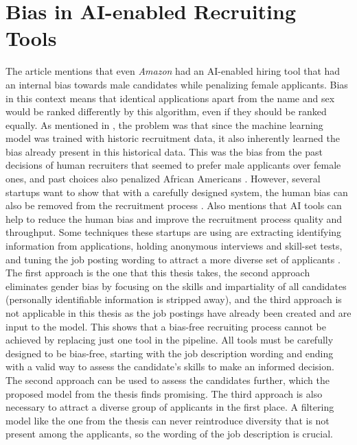 \documentclass[draft,final]{thesisclass} %
\begin{document}
\section{Bias in \acs{AI}-enabled Recruiting Tools}
The article \textcite[9]{bias_ai_hiring} mentions that even \textit{Amazon} had an \acs{AI}-enabled hiring tool that had an internal bias towards male candidates while penalizing female applicants.
Bias in this context means that identical applications apart from the name and sex would be ranked differently by this algorithm, even if they should be ranked equally.
As mentioned in \textcite[9]{bias_ai_hiring}, the problem was that since the machine learning model was trained with historic recruitment data, it also inherently learned the bias already present in this historical data.
This was the bias from the past decisions of human recruiters that seemed to prefer male applicants over female ones, and past choices also penalized African Americans \parencite[9-10]{bias_ai_hiring}.
However, several startups want to show that with a carefully designed system, the human bias can also be removed from the recruitment process \parencite[9]{bias_ai_hiring}. Also \textcite[65]{ai_impact_recruitment_selection} mentions that \acs{AI} tools can help to reduce the human bias and improve the recruitment process quality and throughput.
Some techniques these startups are using are extracting identifying information from applications, holding anonymous interviews and skill-set tests, and tuning the job posting wording to attract a more diverse set of applicants \parencite[9]{bias_ai_hiring}.
The first approach is the one that this thesis takes, the second approach eliminates gender bias by focusing on the skills and impartiality of all candidates (personally identifiable information is stripped away), and the third approach is not applicable in this thesis as the job postings have already been created and are input to the model.
This shows that a bias-free recruiting process cannot be achieved by replacing just one tool in the pipeline. All tools must be carefully designed to be bias-free, starting with the job description wording and ending with a valid way to assess the candidate's skills to make an informed decision.
The second approach can be used to assess the candidates further, which the proposed model from the thesis finds promising. The third approach is also necessary to attract a diverse group of applicants in the first place.
A filtering model like the one from the thesis can never reintroduce diversity that is not present among the applicants, so the wording of the job description is crucial.
\end{document}
